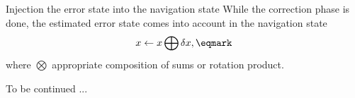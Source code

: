 \sec Injection the error state into the navigation state
While the correction phase is done, the estimated error state comes into account in the navigation state
$$
x \leftarrow x \bigoplus \delta x,
\eqmark
$$
where 
\begitems
$\bigotimes$ appropriate composition of sums or rotation product. 
\enditems

To be continued ...


